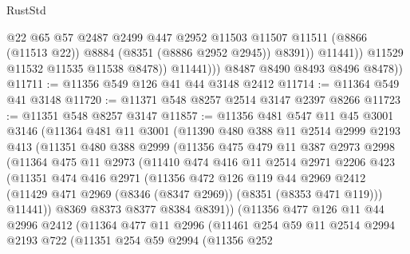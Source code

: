 \begin{lexlean}{RustStd}
\begin{coremodule}
{\begin{coremodule}
{{{{{{{{{{{{{{{{{{{{{{{{{{{{{{{{{{{{{{{{{{{{{{{{{{                          @22
                          @65
                          @57
                          @2487
                          @2499
                          @447
                          @2952
                          @11503
                          @11507
                          @11511
                          (@8866 (@11513 @22))
                          @8884
                          (@8351 (@8886 @2952 @2945))
                          @8391))
                      @11441))
                  @11529
                  @11532
                  @11535
                  @11538
                  @8478))
              @11441)))
        @8487
        @8490
        @8493
        @8496
        @8478))
@11711 := @11356 @549 @126 @41 @44 @3148 @2412
@11714 := @11364 @549 @41 @3148
@11720 := @11371 @548 @8257 @2514 @3147 @2397 @8266
@11723 := @11351 @548 @8257 @3147
@11857 := @11356
    @481
    @547
    @11
    @45
    @3001
    @3146
    (@11364
      @481
      @11
      @3001
      (@11390
        @480
        @388
        @11
        @2514
        @2999
        @2193
        @413
        (@11351
          @480
          @388
          @2999
          (@11356
            @475
            @479
            @11
            @387
            @2973
            @2998
            (@11364
              @475
              @11
              @2973
              (@11410
                @474
                @416
                @11
                @2514
                @2971
                @2206
                @423
                (@11351
                  @474
                  @416
                  @2971
                  (@11356
                    @472
                    @126
                    @119
                    @44
                    @2969
                    @2412
                    (@11429 @471 @2969 (@8346 (@8347 @2969)) (@8351 (@8353 @471 @119)))
                    @11441))
                @8369
                @8373
                @8377
                @8384
                @8391))
            (@11356
              @477
              @126
              @11
              @44
              @2996
              @2412
              (@11364
                @477
                @11
                @2996
                (@11461
                  @254
                  @59
                  @11
                  @2514
                  @2994
                  @2193
                  @722
                  (@11351
                    @254
                    @59
                    @2994
                    (@11356
                      @252
}}}}}}}}}}}}}}}}}}}}}}}}}}}}}}}}}}}}}}}}}}}}}}}}}}
\end{coremodule}}
\end{coremodule}
\end{lexlean}
